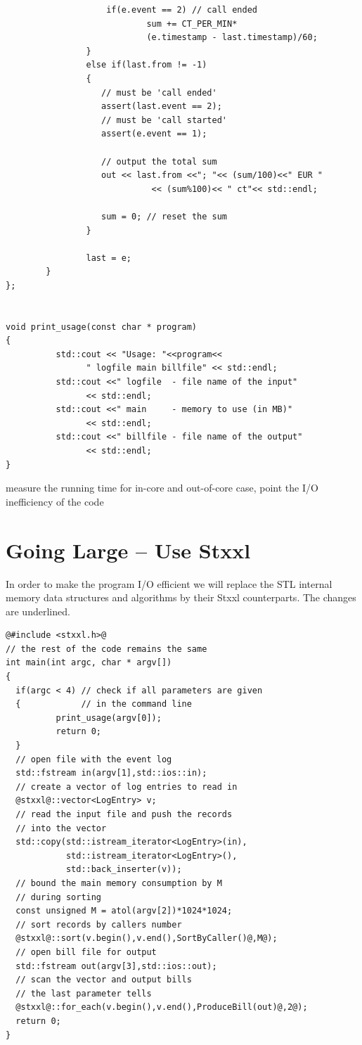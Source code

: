 \documentclass[twoside]{book}
\newcommand{\stxxl}{{\sc Stxxl} }
\begin{document}
\begin{lstlisting}
                    if(e.event == 2) // call ended
                            sum += CT_PER_MIN*
                            (e.timestamp - last.timestamp)/60;
                }
                else if(last.from != -1)
                {
                   // must be 'call ended'
                   assert(last.event == 2);
                   // must be 'call started'
                   assert(e.event == 1);
                        
                   // output the total sum
                   out << last.from <<"; "<< (sum/100)<<" EUR "
                             << (sum%100)<< " ct"<< std::endl;
                        
                   sum = 0; // reset the sum
                }
                        
                last = e;
        }
};


void print_usage(const char * program)
{
          std::cout << "Usage: "<<program<<
                " logfile main billfile" << std::endl;
          std::cout <<" logfile  - file name of the input"
                << std::endl;
          std::cout <<" main     - memory to use (in MB)"
                << std::endl;
          std::cout <<" billfile - file name of the output"
                << std::endl;
}

\end{lstlisting}

measure the running time for in-core and out-of-core case,
point the I/O inefficiency of the code

\section{Going Large -- Use \stxxl}
In order to make the program I/O efficient we will replace the STL
internal memory data structures and algorithms by their \stxxl
counterparts. The changes are underlined.

\begin{lstlisting}
@#include <stxxl.h>@
// the rest of the code remains the same
int main(int argc, char * argv[])
{
  if(argc < 4) // check if all parameters are given 
  {            // in the command line
          print_usage(argv[0]);
          return 0;
  }
  // open file with the event log
  std::fstream in(argv[1],std::ios::in);
  // create a vector of log entries to read in
  @stxxl@::vector<LogEntry> v;
  // read the input file and push the records
  // into the vector
  std::copy(std::istream_iterator<LogEntry>(in),
            std::istream_iterator<LogEntry>(),
            std::back_inserter(v));
  // bound the main memory consumption by M 
  // during sorting
  const unsigned M = atol(argv[2])*1024*1024;
  // sort records by callers number
  @stxxl@::sort(v.begin(),v.end(),SortByCaller()@,M@);
  // open bill file for output
  std::fstream out(argv[3],std::ios::out);
  // scan the vector and output bills
  // the last parameter tells
  @stxxl@::for_each(v.begin(),v.end(),ProduceBill(out)@,2@);
  return 0;
}
\end{lstlisting}
\end{document}
